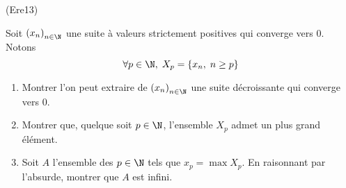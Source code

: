\begin{tiny}(Ere13)\end{tiny} Soit $\left( x_n\right)_{n\in \N}$ une suite à valeurs strictement positives qui converge vers $0$. Notons
\begin{displaymath}
\forall p \in \N,\;
X_p = \left\lbrace x_n,\; n\geq p\right\rbrace 
\end{displaymath}
\begin{enumerate}
  \item Montrer l'on peut extraire de $\left( x_n\right)_{n\in \N}$ une suite décroissante qui converge vers $0$.
  \item Montrer que, quelque soit $p\in \N$, l'ensemble $X_p$ admet un plus grand élément.
  \item Soit $A$ l'ensemble des $p\in \N$ tels que $x_p = \max X_p$. En raisonnant par l'absurde, montrer que $A$ est infini.
\end{enumerate}

 